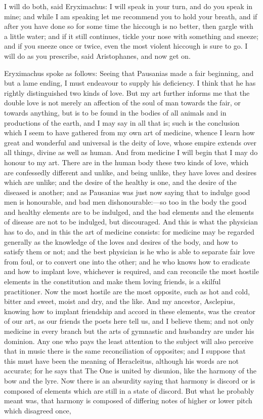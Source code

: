 \documentclass[11pt,letter]{article}
\begin{document}
\par  I will do both, said Eryximachus: I will speak in your turn, and do you speak in mine; and while I am speaking let me recommend you to hold your breath, and if after you have done so for some time the hiccough is no better, then gargle with a little water; and if it still continues, tickle your nose with something and sneeze; and if you sneeze once or twice, even the most violent hiccough is sure to go. I will do as you prescribe, said Aristophanes, and now get on.

\par  Eryximachus spoke as follows: Seeing that Pausanias made a fair beginning, and but a lame ending, I must endeavour to supply his deficiency. I think that he has rightly distinguished two kinds of love. But my art further informs me that the double love is not merely an affection of the soul of man towards the fair, or towards anything, but is to be found in the bodies of all animals and in productions of the earth, and I may say in all that is; such is the conclusion which I seem to have gathered from my own art of medicine, whence I learn how great and wonderful and universal is the deity of love, whose empire extends over all things, divine as well as human. And from medicine I will begin that I may do honour to my art. There are in the human body these two kinds of love, which are confessedly different and unlike, and being unlike, they have loves and desires which are unlike; and the desire of the healthy is one, and the desire of the diseased is another; and as Pausanias was just now saying that to indulge good men is honourable, and bad men dishonourable:—so too in the body the good and healthy elements are to be indulged, and the bad elements and the elements of disease are not to be indulged, but discouraged. And this is what the physician has to do, and in this the art of medicine consists: for medicine may be regarded generally as the knowledge of the loves and desires of the body, and how to satisfy them or not; and the best physician is he who is able to separate fair love from foul, or to convert one into the other; and he who knows how to eradicate and how to implant love, whichever is required, and can reconcile the most hostile elements in the constitution and make them loving friends, is a skilful practitioner. Now the most hostile are the most opposite, such as hot and cold, bitter and sweet, moist and dry, and the like. And my ancestor, Asclepius, knowing how to implant friendship and accord in these elements, was the creator of our art, as our friends the poets here tell us, and I believe them; and not only medicine in every branch but the arts of gymnastic and husbandry are under his dominion. Any one who pays the least attention to the subject will also perceive that in music there is the same reconciliation of opposites; and I suppose that this must have been the meaning of Heracleitus, although his words are not accurate; for he says that The One is united by disunion, like the harmony of the bow and the lyre. Now there is an absurdity saying that harmony is discord or is composed of elements which are still in a state of discord. But what he probably meant was, that harmony is composed of differing notes of higher or lower pitch which disagreed once, 
\end{document}
